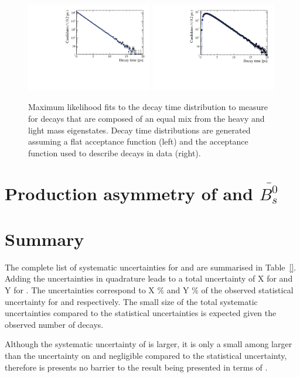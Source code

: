 \begin{figure}[htbp]
  \centering
    \includegraphics[width=0.49\textwidth]{./Figs/LifetimeSystematics/No_acc_fit.pdf}
    \includegraphics[width=0.49\textwidth]{./Figs/LifetimeSystematics/Acc_fit.pdf}
  \caption{Maximum likelihood fits to the decay time distribution to measure \tmumu for \bsmumu decays that are composed of an equal mix from the heavy and light mass eigenstates. Decay time distributions are generated assuming a flat acceptance function (left) and the acceptance function used to describe \bsmumu decays in data (right).}
  \label{fig:mixofstates}
\end{figure}


\section{Production asymmetry of \bs and $\bar{B_{s}^{0}}$}
\label{sec:productionasymetry}

\section{Summary}
\label{sec:systematicsSummary}

The complete list of systematic uncertainties for \tmumu and \Gmumu are summarised in Table~\ref{}. Adding the uncertainties in quadrature leads to a total uncertainty of X for \tmumu and Y for \Gmumu. The uncertainties correspond to X $\%$ and Y $\%$ of the observed statistical uncertainty for \tmumu and \Gmumu respectively. The small size of the total systematic uncertainties compared to the statistical uncertainties is expected given the observed number of decays. 

Although the systematic uncertainty of \tmumu is larger, it is only a small among larger than the uncertainty on \Gmumu and negligible compared to the statistical uncertainty, therefore is presents no barrier to the result being presented in terms of \tmumu.

